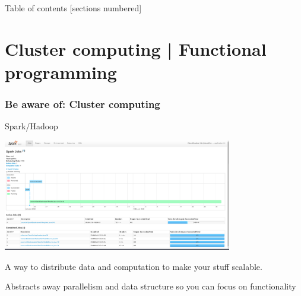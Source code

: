 \documentclass[10pt]{beamer}
\begin{document}
\begin{frame}{Table of contents}
  [sections numbered]
  \tableofcontents[hideallsubsections]
\end{frame}




















\section{Cluster computing | Functional programming}

\begin{frame}[c]\frametitle{Be aware of: Cluster computing}

Spark/Hadoop

\pause

\centerline{\includegraphics[width=10cm]{figs/spark.png}}

A way to distribute data and computation to make your stuff scalable.

Abstracts away parallelism and data structure so you can focus on functionality

\end{frame}
\end{document}

